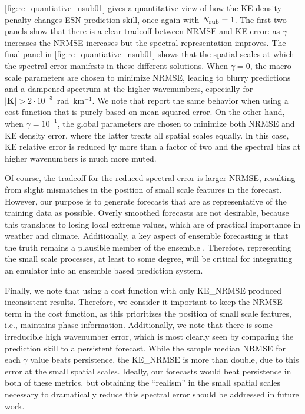 \documentclass[draft]{agujournal2019}
\newcommand{\citep}{\cite}
\newcommand{\citet}{\citeA}
\begin{document}
\cref{fig:rc_quantiative_nsub01} gives a quantitative view of how the KE density
penalty changes ESN prediction skill, once again with $N_\text{sub}=1$.
The first two panels show that there is a clear tradeoff between NRMSE and KE error:
as $\gamma$ increases the NRMSE increases but the spectral representation improves.
The final panel in \cref{fig:rc_quantiative_nsub01}
shows that the spatial scales at which the spectral error manifests in these
different solutions.
When $\gamma=0$, the macro-scale parameters are chosen to minimize NRMSE,
leading to blurry predictions and a dampened spectrum at the higher wavenumbers,
especially for $|\mathbf{K}| > 2\cdot10^{-3}$~rad~km$^{-1}$.
We note that \citet{lam_graphcast_2022} report the same behavior when using a cost function that is purely based on mean-squared error.
On the other hand, when $\gamma = 10^{-1}$, the global parameters are chosen to
minimize both NRMSE and KE density error, where the latter treats all spatial
scales equally.
In this case, KE relative error is reduced by more than a factor of two and the
spectral bias at higher wavenumbers is much more muted.


Of course, the tradeoff for the reduced spectral error is larger NRMSE, resulting
from slight mismatches in the position of small scale features in the forecast.
However, our purpose is to generate forecasts that are as representative
of the training data as possible.
Overly smoothed forecasts are not desirable, because this translates to losing local extreme values,
which are of practical importance in weather and climate.
Additionally, a key aspect of ensemble forecasting is that the truth remains a
plausible member of the ensemble \citep{kalnay_ensemble_2006}.
Therefore, representing the small scale processes, at least to some degree,
will be critical for integrating an
emulator into an ensemble based prediction system.

Finally, we note that using a cost function with only KE\_NRMSE produced inconsistent
results.
Therefore, we consider it important to keep the NRMSE term in the
cost function, as this prioritizes the position of small scale features, i.e.,
maintains phase information.
Additionally, we note that there is some irreducible high wavenumber error,
which is most clearly seen by comparing the prediction skill to a persistent
forecast.
While the sample median NRMSE for each $\gamma$ value beats persistence, the
KE\_NRMSE is more than double, due to this error at the small spatial scales.
Ideally, our forecasts would beat persistence in both of these metrics, but
obtaining the ``realism'' in the small spatial scales necessary to
dramatically reduce this spectral error should be addressed in future work.
\end{document}
